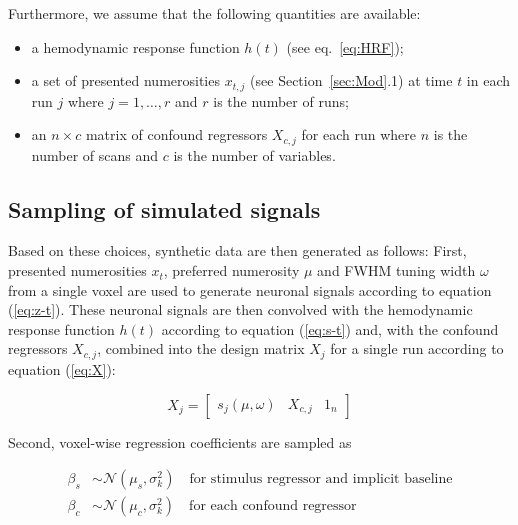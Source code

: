 \documentclass[a4paper,12pt]{article}
\begin{document}
Furthermore, we assume that the following quantities are available:

\begin{itemize}

\item a hemodynamic response function $h(t)$ (see eq.~\ref{eq:HRF});

\item a set of presented numerosities $x_{t,j}$ (see Section~\ref{sec:Mod}.1) at time $t$ in each run $j$ where $j = 1,\ldots,r$ and $r$ is the number of runs;

\item an $n \times c$ matrix of confound regressors $X_{c,j}$ for each run where $n$ is the number of scans and $c$ is the number of variables.
	
\end{itemize}


\subsection{Sampling of simulated signals}

Based on these choices, synthetic data are then generated as follows: First, presented numerosities $x_t$, preferred numerosity $\mu$ and FWHM tuning width $\omega$ from a single voxel are used to generate neuronal signals according to equation (\ref{eq:z-t}). These neuronal signals are then convolved with the hemodynamic response function $h(t)$ according to equation (\ref{eq:s-t}) and, with the confound regressors $X_{c,j}$, combined into the design matrix $X_j$ for a single run according to equation (\ref{eq:X}):

\begin{equation} \label{eq:Xj}
X_j = \left[ \begin{matrix} s_j(\mu,\omega) & X_{c,j} & 1_n \end{matrix} \right]
\end{equation}

Second, voxel-wise regression coefficients are sampled as

\vspace{-0.5em}
\begin{equation} \label{eq:b}
\begin{split}
\beta_s &\sim \mathcal{N}(\mu_s, \sigma_k^2) \quad \text{for stimulus regressor and implicit baseline} \\
\beta_c &\sim \mathcal{N}(\mu_c, \sigma_k^2) \quad \text{for each confound regressor}
\end{split}
\end{equation}
\end{document}
